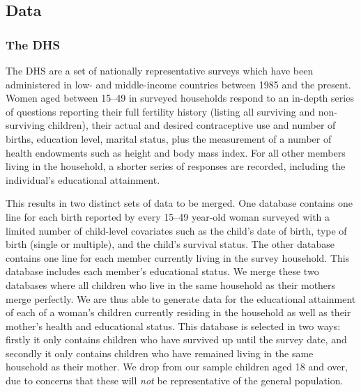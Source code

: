 \subsection{Data}                                  \label{TWINsscn:data}
\subsubsection{The DHS}
The DHS are a set of nationally representative surveys which have been 
administered in low- and middle-income countries between 1985 and the present. 
Women aged between 15--49 in surveyed households respond to an in-depth series 
of questions reporting their full fertility history (listing all surviving and 
non-surviving children), their actual and desired contraceptive use and number 
of births, education level, marital status, plus the measurement of a number of 
health endowments such as height and body mass index. For all other members 
living in the household, a shorter series of responses are recorded, including 
the individual's educational attainment.

This results in two distinct sets of data to be merged. One database contains 
one line for each birth reported by every 15--49 year-old woman surveyed with a 
limited number of child-level covariates such as the child's date of birth, type 
of birth (single or multiple), and the child's survival status. The other 
database contains one line for each member currently living in the survey
household. This database includes each member's educational status. We merge
these two databases where all children who live in the same household as their 
mothers merge perfectly.  We are thus able to generate data for the educational 
attainment of each of a woman's children currently residing in the household as 
well as their mother's health and educational status. This database is selected in 
two ways: firstly it only contains children who have survived up until the survey 
date, and secondly it only contains children who have remained living in the same 
household as their mother. We drop from our sample children aged 18 and over, due
to concerns that these will \emph{not} be representative of the general 
population.

